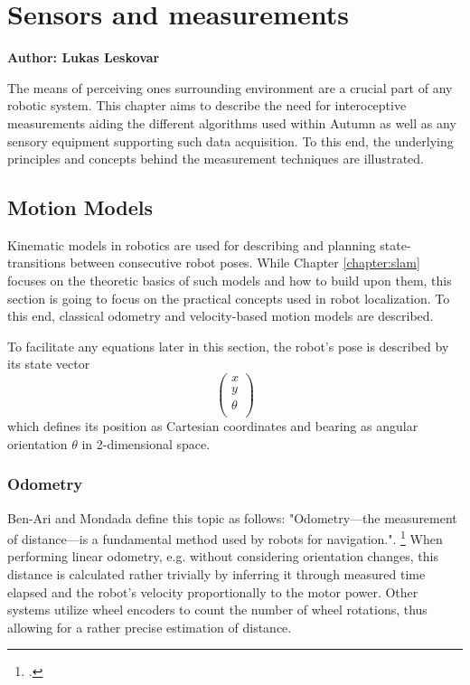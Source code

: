 \chapter{Sensors and measurements}\label{chapter:sensors}

\textbf{Author: Lukas Leskovar} 

The means of perceiving ones surrounding environment are a crucial part of any robotic system. This chapter aims to describe the need for interoceptive measurements aiding the different algorithms used within Autumn as well as any sensory equipment supporting such data acquisition. To this end, the underlying principles and concepts behind the measurement techniques are illustrated.

\section{Motion Models}
Kinematic models in robotics are used for describing and planning state-transitions between consecutive robot poses. While Chapter \ref{chapter:slam} focuses on the theoretic basics of such models and how to build upon them, this section is going to focus on the practical concepts used in robot localization. To this end, classical odometry and velocity-based motion models are described.

To facilitate any equations later in this section, the robot's pose is described by its state vector 
\[
\begin{pmatrix}
	x \\
	y \\
	\theta \\
\end{pmatrix}
\] 
which defines its position as Cartesian coordinates and bearing as angular orientation $\theta$ in 2-dimensional space. 

\subsection{Odometry}
Ben-Ari and Mondada define this topic as follows: "Odometry—the measurement of distance—is a fundamental method used by robots for navigation.". \footcite[Page 69]{ben2017elements} 
When performing linear odometry, e.g. without considering orientation changes, this distance is calculated rather trivially by inferring it through measured time elapsed and the robot's velocity proportionally to the motor power. 
Other systems utilize wheel encoders to count the number of wheel rotations, thus allowing for a rather precise estimation of distance. 

